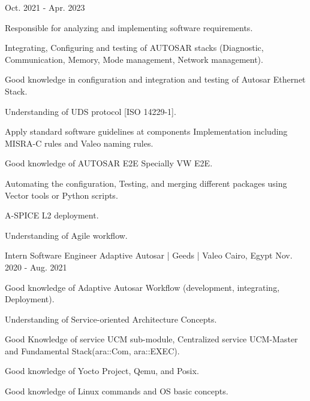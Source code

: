 \begin{cventries}
    {\normalsize Oct. 2021 - Apr. 2023} %
    {
      \begin{cvitems} %
        \item {\normalsize Responsible for analyzing and implementing software requirements.}
        \item {\normalsize Integrating, Configuring and testing of AUTOSAR stacks (Diagnostic, Communication, Memory, Mode management, Network management).}
        \item {\normalsize Good knowledge in configuration and integration and testing of Autosar Ethernet Stack.}
        \item {\normalsize Understanding of UDS protocol [ISO 14229-1].}
        \item {\normalsize Apply standard software guidelines at components Implementation including MISRA-C rules and Valeo naming rules.}
        \item {\normalsize Good knowledge of AUTOSAR E2E Specially VW E2E.}
        \item {\normalsize Automating the configuration, Testing, and merging different packages using Vector tools or Python scripts.}
        \item{\normalsize A-SPICE L2 deployment.}
        \item {\normalsize Understanding of Agile workflow.}
      \end{cvitems}
    }
  \cventry
    {\normalsize Intern Software Engineer} %
    {\newline \Large Adaptive Autosar | Geeds | Valeo} %
    {\normalsize Cairo, Egypt} %
    {\normalsize Nov. 2020 - Aug. 2021} %
    {
      \begin{cvitems} %
        \item {\normalsize Good knowledge of Adaptive Autosar Workflow (development, integrating, Deployment).}
        \item {\normalsize Understanding of Service-oriented Architecture Concepts.}
        \item {\normalsize Good Knowledge of service UCM sub-module, Centralized service UCM-Master and Fundamental Stack(ara::Com, ara::EXEC).}
        \item {\normalsize Good knowledge of Yocto Project, Qemu, and Posix.}
        \item {\normalsize Good knowledge of Linux commands and OS basic concepts.}

\end{cvitems}}
\end{cventries}
